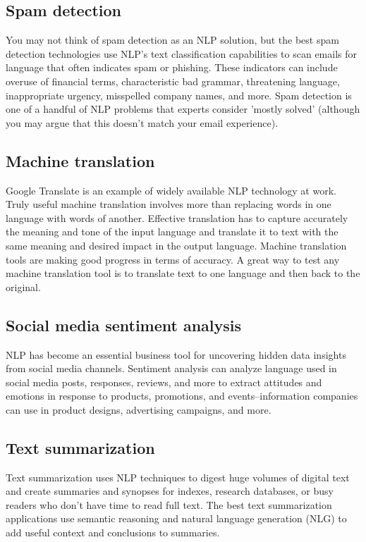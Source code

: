 \documentclass[11pt]{article}
\begin{document}
\subsection{Spam detection}
\label{sec:orgbf0b167}
You may not think of spam detection as an NLP solution, but the best spam detection
technologies use NLP's text classification capabilities to scan emails for language
that often indicates spam or phishing. These indicators can include overuse of
financial terms, characteristic bad grammar, threatening language, inappropriate
urgency, misspelled company names, and more. Spam detection is one of a handful
of NLP problems that experts consider 'mostly solved' (although you may argue that
this doesn’t match your email experience).

\subsection{Machine translation}
\label{sec:org8b6fce4}
Google Translate is an example of widely available NLP technology at work.
Truly useful machine translation involves more than replacing words in one language
with words of another.  Effective translation has to capture accurately the meaning
and tone of the input language and translate it to text with the same meaning and
desired impact in the output language. Machine translation tools are making good
progress in terms of accuracy. A great way to test any machine translation tool is
to translate text to one language and then back to the original.

\subsection{Social media sentiment analysis}
\label{sec:orga1c62ab}
NLP has become an essential business tool for uncovering hidden data insights from
social media channels. Sentiment analysis can analyze language used in social media
posts, responses, reviews, and more to extract attitudes and emotions in response
to products, promotions, and events–information companies can use in product designs,
advertising campaigns, and more.

\subsection{Text summarization}
\label{sec:org39f7cfc}
Text summarization uses NLP techniques to digest huge volumes of digital text and
create summaries and synopses for indexes, research databases, or busy readers who
don't have time to read full text. The best text summarization applications use
semantic reasoning and natural language generation (NLG) to add useful context
and conclusions to summaries.
\end{document}
